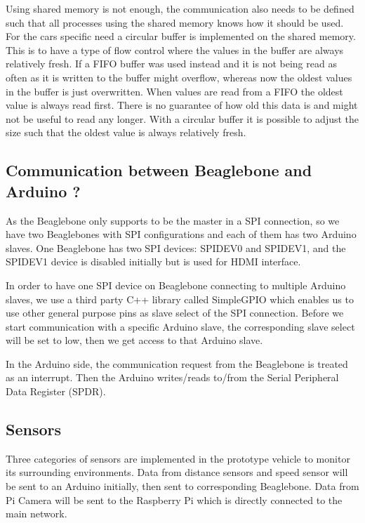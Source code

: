 \documentclass[11pt, titlepage]{article} %
\begin{document}
Using shared memory is not enough, the communication also needs to be defined such that all processes using the shared memory knows how it should be used. For the cars specific need a circular buffer is implemented on the shared memory. This is to have a type of flow control where the values in the buffer are always relatively fresh. If a FIFO buffer was used instead and it is not being read as often as it is written to  the buffer might overflow, whereas now the oldest values in the buffer is just overwritten. When values are read from a FIFO the oldest value is always read first. There is no guarantee of how old this data is and might not be useful to read any longer. With a circular buffer it is possible to adjust the size such that the oldest value is always relatively fresh.


\subsection{Communication between Beaglebone and Arduino ?}
As the Beaglebone only supports to be the master in a SPI connection, so we have two Beaglebones with SPI configurations and each of them has two Arduino slaves. One Beaglebone has two SPI devices: SPIDEV0 and SPIDEV1, and the SPIDEV1 device is disabled initially but is used for HDMI interface. 

In order to have one SPI device on Beaglebone connecting to multiple Arduino slaves, we use a third party C++ library called SimpleGPIO which enables us to use other general purpose pins as slave select of the SPI connection. Before we start communication with a specific Arduino slave, the corresponding slave select will be set to low, then we get access to that Arduino slave.

In the Arduino side, the communication request from the Beaglebone is treated as an interrupt. Then the Arduino writes/reads to/from the Serial Peripheral Data Register (SPDR). 
\subsection{Sensors}
Three categories of sensors are implemented in the prototype vehicle to monitor its surrounding environments. Data from distance sensors and speed sensor will be sent to an Arduino initially, then sent to corresponding Beaglebone. Data from Pi Camera will be sent to the Raspberry Pi which is directly connected to the main network.
\end{document}

